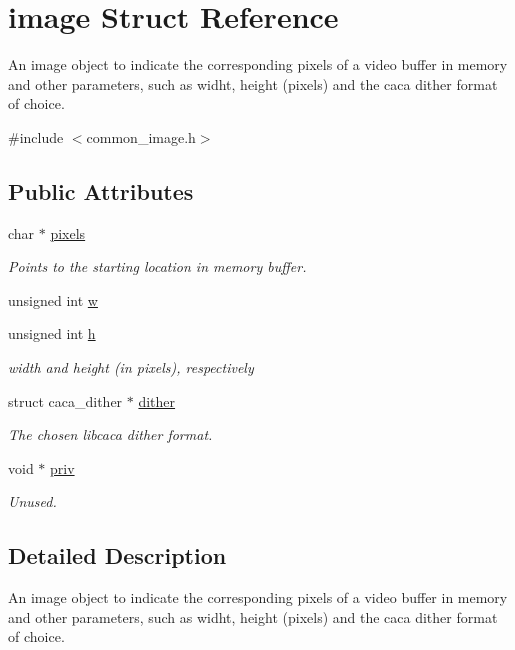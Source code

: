 \hypertarget{structimage}{\section{image \-Struct \-Reference}
\label{structimage}
}


\-An image object to indicate the corresponding pixels of a video buffer in memory and other parameters, such as widht, height (pixels) and the caca dither format of choice.  




{\ttfamily \#include $<$common\-\_\-image.\-h$>$}

\subsection*{\-Public \-Attributes}
\begin{DoxyCompactItemize}
\item 
char $\ast$ \hyperlink{structimage_abc3d14f227fa7594c545fb7e24b8943f}{pixels}
\begin{DoxyCompactList}\small\item\em \-Points to the starting location in memory buffer. \end{DoxyCompactList}\item 
unsigned int \hyperlink{structimage_ac4f737a4fb48b7bf4407d5fbe3da141d}{w}
\item 
unsigned int \hyperlink{structimage_a4fae3d432ea8b597707f29f60124807f}{h}
\begin{DoxyCompactList}\small\item\em width and height (in pixels), respectively \end{DoxyCompactList}\item 
struct caca\-\_\-dither $\ast$ \hyperlink{structimage_a31d7561b213cedafefd358611142691a}{dither}
\begin{DoxyCompactList}\small\item\em \-The chosen libcaca dither format. \end{DoxyCompactList}\item 
void $\ast$ \hyperlink{structimage_af79bc78a92bf22a8bb06c5ae706a2db9}{priv}
\begin{DoxyCompactList}\small\item\em \-Unused. \end{DoxyCompactList}\end{DoxyCompactItemize}


\subsection{\-Detailed \-Description}
\-An image object to indicate the corresponding pixels of a video buffer in memory and other parameters, such as widht, height (pixels) and the caca dither format of choice. 

